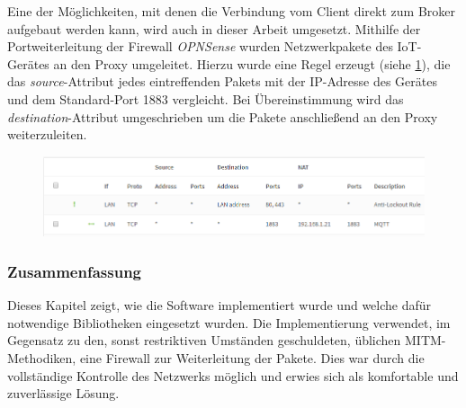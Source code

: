     Eine der Möglichkeiten, mit denen die Verbindung vom Client direkt zum Broker aufgebaut werden kann, wird auch in dieser Arbeit umgesetzt.
    Mithilfe der Portweiterleitung der Firewall \emph{OPNSense} wurden Netzwerkpakete des \ac{IoT}-Gerätes an den Proxy umgeleitet. Hierzu wurde eine Regel erzeugt (siehe \ref{fig:firewall_rule}), die das \emph{source}-Attribut jedes eintreffenden Pakets mit der IP-Adresse des Gerätes und dem Standard-Port 1883 vergleicht. Bei Übereinstimmung wird das \emph{destination}-Attribut umgeschrieben um die Pakete anschließend an den Proxy weiterzuleiten.
    \begin{figure}[h]%
        \centering
        \includegraphics[width=14cm]{tex/bilder/5_implementierung/firewall.PNG}
        \label{fig:firewall_rule}
    \end{figure}
    
\subsubsection{Zusammenfassung}
    Dieses Kapitel zeigt, wie die Software implementiert wurde und welche dafür notwendige Bibliotheken eingesetzt wurden. Die Implementierung verwendet, im Gegensatz zu den, sonst restriktiven Umständen geschuldeten, üblichen \ac{MITM}-Methodiken, eine Firewall zur Weiterleitung der Pakete. Dies war durch die vollständige Kontrolle des Netzwerks möglich und erwies sich als komfortable und zuverlässige Lösung.